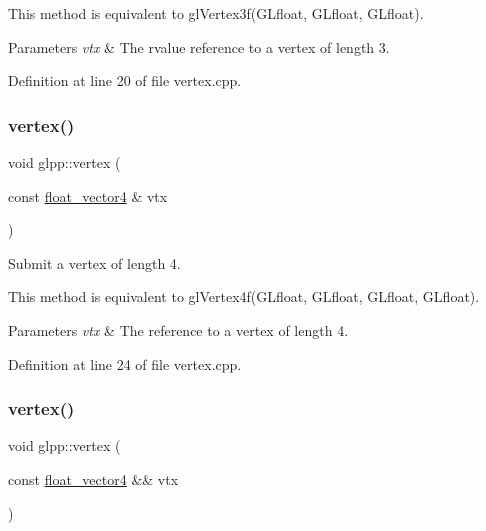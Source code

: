 This method is equivalent to gl\+Vertex3f(\+G\+Lfloat, G\+Lfloat, G\+Lfloat).


\begin{DoxyParams}{Parameters}
{\em vtx} & The rvalue reference to a vertex of length 3. \\
\hline
\end{DoxyParams}


Definition at line 20 of file vertex.\+cpp.

\mbox{\label{namespaceglpp_a17db8234f91d9220706de37164127f26}} 
\subsubsection{\texorpdfstring{vertex()}{vertex()}\hspace{0.1cm}{\footnotesize\ttfamily [5/8]}}
{\footnotesize\ttfamily void glpp\+::vertex (\begin{DoxyParamCaption}\item[{const \hyperlink{namespaceglpp_ab4a3d7b8ed8e2e4810006eef5213a460}{float\+\_\+vector4} \&}]{vtx }\end{DoxyParamCaption})\hspace{0.3cm}{\ttfamily [noexcept]}}



Submit a vertex of length 4. 

This method is equivalent to gl\+Vertex4f(\+G\+Lfloat, G\+Lfloat, G\+Lfloat, G\+Lfloat).


\begin{DoxyParams}{Parameters}
{\em vtx} & The reference to a vertex of length 4. \\
\hline
\end{DoxyParams}


Definition at line 24 of file vertex.\+cpp.

\mbox{\label{namespaceglpp_a7c8b5d363003996d111b08a87ee04d41}} 
\subsubsection{\texorpdfstring{vertex()}{vertex()}\hspace{0.1cm}{\footnotesize\ttfamily [6/8]}}
{\footnotesize\ttfamily void glpp\+::vertex (\begin{DoxyParamCaption}\item[{const \hyperlink{namespaceglpp_ab4a3d7b8ed8e2e4810006eef5213a460}{float\+\_\+vector4} \&\&}]{vtx }\end{DoxyParamCaption})\hspace{0.3cm}{\ttfamily [noexcept]}}



